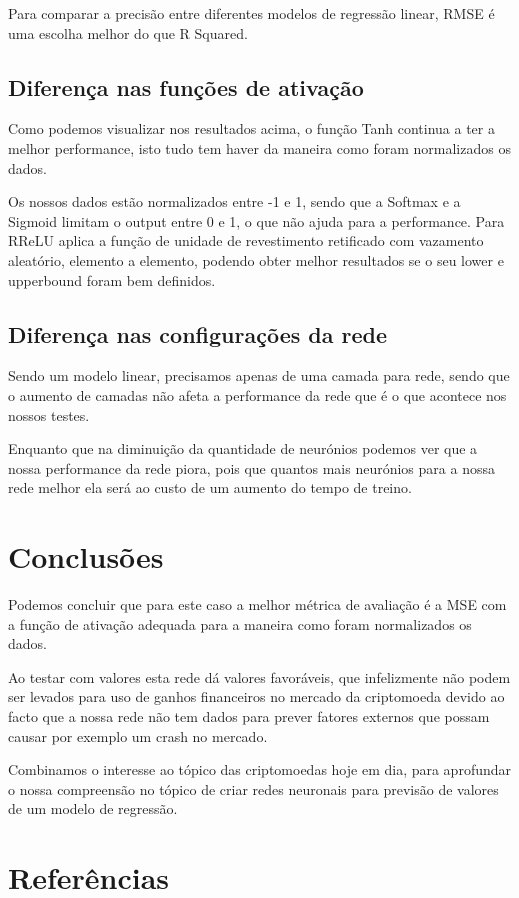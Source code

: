 \documentclass[10pt]{article}
\begin{document}
Para comparar a precisão entre diferentes modelos de 
regressão linear, RMSE é uma escolha melhor do que R Squared.

\subsection{Diferença nas funções de ativação}

Como podemos visualizar nos resultados acima, o função Tanh continua
a ter a melhor performance, isto tudo tem haver da maneira como foram
normalizados os dados.

Os nossos dados estão normalizados entre -1 e 1, sendo que a Softmax e a Sigmoid
limitam o output entre 0 e 1, o que não ajuda para a performance.
Para RReLU aplica a função de unidade de revestimento 
retificado com vazamento aleatório, elemento a elemento,
podendo obter melhor resultados se o seu lower e upperbound
foram bem definidos.

\subsection{Diferença nas configurações da rede}

Sendo um modelo linear, precisamos apenas de uma camada para
rede, sendo que o aumento de camadas não afeta a performance da rede
que é o que acontece nos nossos testes.

Enquanto que na diminuição da quantidade de neurónios podemos ver 
que a nossa performance da rede piora, pois que quantos mais neurónios
para a nossa rede melhor ela será ao custo de um aumento do tempo
de treino.

\vspace{3cm}
\section{Conclusões}\label{sec:an-da-info-fin-da-org}
Podemos concluir que para este caso a melhor métrica de avaliação
é a MSE com a função de ativação adequada para a maneira como foram
normalizados os dados.

Ao testar com valores esta rede dá valores favoráveis, que infelizmente
não podem ser levados para uso de ganhos financeiros no mercado
da criptomoeda devido ao facto que a nossa rede não tem dados
para prever fatores externos que possam causar por exemplo
um crash no mercado.

Combinamos o interesse ao tópico das criptomoedas hoje em dia, 
para aprofundar o nossa compreensão no tópico de criar redes 
neuronais para previsão de valores de um modelo de regressão.


\vspace{1cm}

\section{Referências}\label{sec:sup-inf-utl}


\nocite{Binance_2021}
\nocite{Pytorch}
\nocite{Pytorch_nn}



\pagebreak
\end{document}
